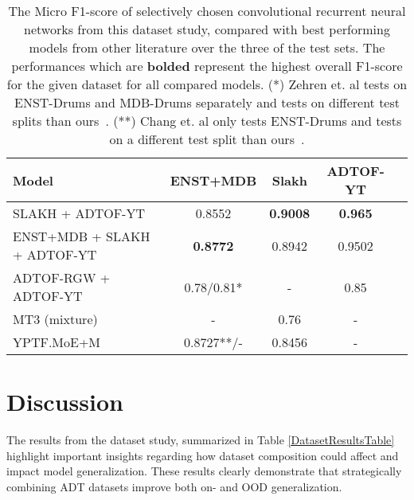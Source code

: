 \begin{table}[H]
    \centering
    \hspace*{-0.6cm}
    \begin{tabular}{l|cccc}
        Model & ENST+MDB & Slakh & ADTOF-YT      \\
        \hline
        SLAKH + ADTOF-YT & 0.8552	& \textbf{0.9008}	& \textbf{0.965} \\
        ENST+MDB + SLAKH + ADTOF-YT & \textbf{0.8772}	& 0.8942	& 0.9502 \\
        \hline
        ADTOF-RGW + ADTOF-YT~\cite{signals4040042} & 0.78/0.81* & - & 0.85 \\
        \hline
        MT3 (mixture)~\cite{gardner2022mt3multitaskmultitrackmusic} & - & 0.76 & - \\
        \hline
        YPTF.MoE+M~\cite{chang2024yourmt3+} & 0.8727**/- & 0.8456 & - \\
    \end{tabular}
    \caption{The Micro F1-score of selectively chosen convolutional recurrent neural networks from this dataset study, compared with best performing models from other literature over the three of the test sets. The performances which are \textbf{bolded} represent the highest overall F1-score for the given dataset for all compared models.
    (*) Zehren et. al tests on ENST-Drums and MDB-Drums separately and tests on different test splits than ours~\cite{signals4040042}.
    (**) Chang et. al only tests ENST-Drums and tests on a different test split than ours~\cite{chang2024yourmt3+}.}
    \label{DatasetComparisonTable}
\end{table}

\section{Discussion}

The results from the dataset study, summarized in Table \ref{DatasetResultsTable} highlight important insights regarding how dataset composition could affect and impact model generalization. These results clearly demonstrate that strategically combining \gls{ADT} datasets improve both on- and \acrfull{OOD} generalization.

